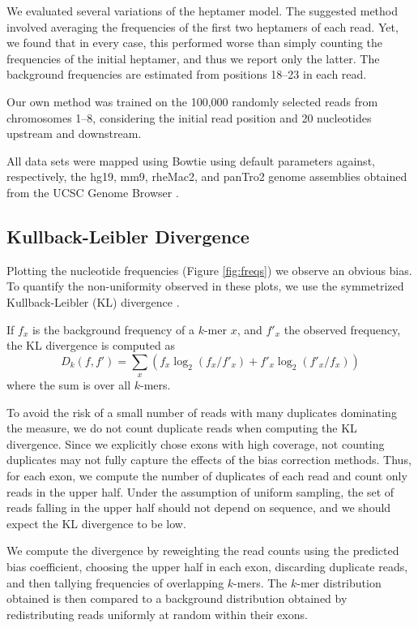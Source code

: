 \documentclass{bioinfo}
\begin{document}
We evaluated several variations of the heptamer model. The suggested method
involved averaging the frequencies of the first two heptamers of each read. Yet,
we found that in every case, this performed worse than simply counting the
frequencies of the initial heptamer, and thus we report only the latter. The
background frequencies are estimated from positions 18--23 in each read.

Our own method was trained on the 100,000 randomly selected reads from
chromosomes 1--8, considering the initial read position and 20 nucleotides
upstream and downstream.

All data sets were mapped using Bowtie \citep{Langmead2009} using default
parameters against, respectively, the hg19, mm9, rheMac2, and panTro2 genome
assemblies obtained from the UCSC Genome Browser \citep{Karolchik2008}.



\subsection{Kullback-Leibler Divergence}

Plotting the nucleotide frequencies (Figure  \ref{fig:freqs}) we observe an
obvious bias. To quantify the non-uniformity observed in these plots, we use the
symmetrized Kullback-Leibler (KL) divergence \citep{Kullback1951}.

If $f_x$ is the background frequency of a $k$-mer $x$, and $f'_x$ the observed
frequency, the KL divergence is computed as
$$D_k( f, f' ) = \sum_{x} \left( f_x \log_{2}( f_x / f'_x ) + f'_x \log_{2}( f'_x / f_x) \right)$$
where the sum is over all $k$-mers.


To avoid the risk of a small number of reads with many duplicates dominating the
measure, we do not count duplicate reads when computing the KL divergence. Since we
explicitly chose exons with high coverage, not counting duplicates may not
fully capture the effects of the bias correction methods. Thus, for each exon,
we compute the number of duplicates of each read and count only reads in the
upper half. Under the assumption of uniform sampling, the set of reads falling
in the upper half should not depend on sequence, and we should expect the KL
divergence to be low.

We compute the divergence by reweighting the read counts using the predicted
bias coefficient, choosing the upper half in each exon, discarding duplicate
reads, and then tallying frequencies of overlapping $k$-mers. The $k$-mer
distribution obtained is then compared to a background distribution obtained by
redistributing reads uniformly at random within their exons.
\end{document}
